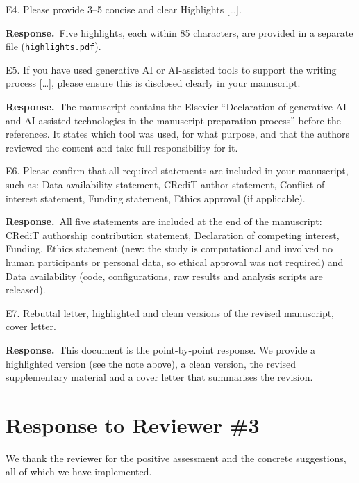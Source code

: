 \documentclass[11pt]{article}
\newcommand{\resp}{\par\smallskip\noindent\textbf{Response.}~}
\begin{document}
\begin{rcomment}{E4.}
Please provide 3--5 concise and clear Highlights [\dots].
\end{rcomment}
\resp Five highlights, each within 85 characters, are provided in a separate file (\texttt{highlights.pdf}).

\begin{rcomment}{E5.}
If you have used generative AI or AI-assisted tools to support the writing process [\dots], please ensure this is disclosed clearly in your manuscript.
\end{rcomment}
\resp The manuscript contains the Elsevier ``Declaration of generative AI and AI-assisted technologies in the manuscript preparation process'' before the references. It states which tool was used, for what purpose, and that the authors reviewed the content and take full responsibility for it.

\begin{rcomment}{E6.}
Please confirm that all required statements are included in your manuscript, such as: Data availability statement, CRediT author statement, Conflict of interest statement, Funding statement, Ethics approval (if applicable).
\end{rcomment}
\resp All five statements are included at the end of the manuscript: CRediT authorship contribution statement, Declaration of competing interest, Funding, Ethics statement (new: the study is computational and involved no human participants or personal data, so ethical approval was not required) and Data availability (code, configurations, raw results and analysis scripts are released).

\begin{rcomment}{E7.}
Rebuttal letter, highlighted and clean versions of the revised manuscript, cover letter.
\end{rcomment}
\resp This document is the point-by-point response. We provide a highlighted version (see the note above), a clean version, the revised supplementary material and a cover letter that summarises the revision.

\section*{Response to Reviewer \#3}
We thank the reviewer for the positive assessment and the concrete suggestions, all of which we have implemented.
\end{document}

